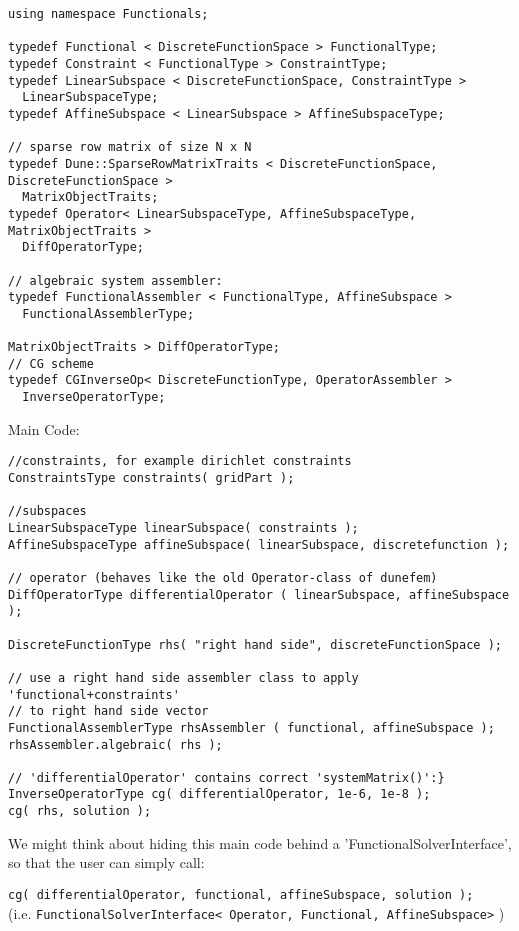 \documentclass[a4paper,11pt]{article}
\numberwithin{equation}{section}
\newcommand{\CodeT}[1]{\textnormal{\texttt{#1}}}
\begin{document}
\begin{lstlisting}
using namespace Functionals;

typedef Functional < DiscreteFunctionSpace > FunctionalType; 
typedef Constraint < FunctionalType > ConstraintType; 
typedef LinearSubspace < DiscreteFunctionSpace, ConstraintType > 
  LinearSubspaceType; 
typedef AffineSubspace < LinearSubspace > AffineSubspaceType; 

// sparse row matrix of size N x N
typedef Dune::SparseRowMatrixTraits < DiscreteFunctionSpace, DiscreteFunctionSpace > 
  MatrixObjectTraits; 
typedef Operator< LinearSubspaceType, AffineSubspaceType, MatrixObjectTraits >   
  DiffOperatorType;

// algebraic system assembler:
typedef FunctionalAssembler < FunctionalType, AffineSubspace > 
  FunctionalAssemblerType;

MatrixObjectTraits > DiffOperatorType; 
// CG scheme
typedef CGInverseOp< DiscreteFunctionType, OperatorAssembler > 
  InverseOperatorType;
\end{lstlisting}
Main Code:
\begin{lstlisting}
//constraints, for example dirichlet constraints
ConstraintsType constraints( gridPart );

//subspaces
LinearSubspaceType linearSubspace( constraints );
AffineSubspaceType affineSubspace( linearSubspace, discretefunction );

// operator (behaves like the old Operator-class of dunefem)
DiffOperatorType differentialOperator ( linearSubspace, affineSubspace );

DiscreteFunctionType rhs( "right hand side", discreteFunctionSpace ); 

// use a right hand side assembler class to apply 'functional+constraints' 
// to right hand side vector
FunctionalAssemblerType rhsAssembler ( functional, affineSubspace );
rhsAssembler.algebraic( rhs );

// 'differentialOperator' contains correct 'systemMatrix()':}
InverseOperatorType cg( differentialOperator, 1e-6, 1e-8 );
cg( rhs, solution );
\end{lstlisting}

We might think about hiding this main code behind a 'FunctionalSolverInterface', so that the user can simply call:

\CodeT{\footnotesize cg( differentialOperator, functional, affineSubspace, solution );}\\
(i.e. \CodeT{FunctionalSolverInterface< Operator, Functional, AffineSubspace>} )
\end{document}
